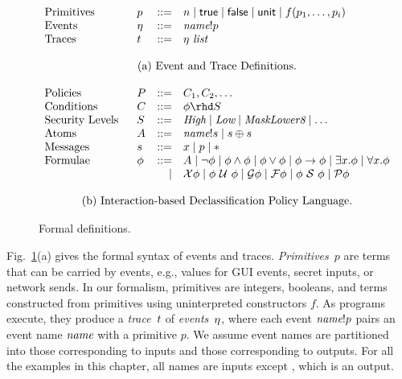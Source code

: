 \begin{figure}[t!]
  \small
  \centering
  \begin{displaymath}
    \begin{array}{p{1in}lrl}
      Primitives & \xv & ::= & n \mid \strue \mid \sfalse \mid \sunit \mid f(\xv_1, \ldots, \xv_i) \\
      Events & \evt & ::= & \sch ! p \\
      Traces & t & ::= & \evt ~ \textit{list} \\
      \\
      \multicolumn{4}{c}{\textrm{(a) Event and Trace Definitions.}} \\
      \\
      Policies & P & ::= & C_1, C_2, \ldots \\
      Conditions & C & ::= & \phi \rhd S\\
      Security Levels & S & ::= & \textit{High} \mid \textit{Low} \mid
      \textit{MaskLower8} \mid \ldots \\
      Atoms & \atom & ::= & \sch!s \mid s \oplus s \\
      Messages & s & ::= & x \mid p \mid \ast \\
      Formulae & \phi & ::= &
      \atom
      \mid \neg \phi
      \mid \phi \wedge \phi
      \mid \phi \vee \phi
      \mid \phi \limplies \phi
      \mid \exists x.\phi 
      \mid \forall x.\phi \\
      && \mid  & \tnext \phi
      \mid \phi \tuntil \phi
      \mid \talways \phi
      \mid \tfuture \phi
      \mid \phi \tsince \phi
      \mid \tpast \phi \\
      \\
      \multicolumn{4}{c}{\textrm{(b) Interaction-based Declassification Policy Language.}}
    \end{array}
  \end{displaymath}
  \caption{Formal definitions.}
  \label{fig:formalism}
\end{figure}

Fig.~\ref{fig:formalism}(a) gives the formal syntax of events and
traces.  \emph{Primitives}~$p$ are terms that can be carried by
events, e.g., values for GUI events, secret inputs, or network
sends.  In our formalism, primitives are integers, booleans, and terms
constructed from primitives using uninterpreted constructors $f$.  As
programs execute, they produce a \emph{trace}~$t$ of
\emph{events}~$\eta$, where each event $\textit{name}!p$ pairs an event name
$\textit{name}$ with a primitive $p$. We assume event names are partitioned
into those corresponding to inputs and those corresponding to
outputs. For all the examples in this chapter, all names are inputs
except , which is an output.

